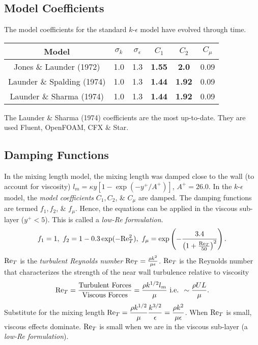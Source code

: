 \documentclass[oneside]{book}
\numberwithin{equation}{section}
\begin{document}
\subsection{Model Coefficients}
The model coefficients for the standard $k$-$\epsilon$ model have evolved through time.
\begin{table}[H]
	\centering
	\begin{tabular}{|c|c|c|c|c|c|}
		\hline
		\textbf{Model} & $\sigma_k$ & $\sigma_\epsilon$ & $C_1$ & $C_2$ & $C_\mu$ \\
		\hline
		Jones \& Launder (1972) & 1.0 & 1.3 & \textbf{1.55} & \textbf{2.0} & 0.09 \\
		\hline
		Launder \& Spalding (1974) & 1.0 & 1.3 & \textbf{1.44} & \textbf{1.92} & 0.09 \\
		\hline
		Launder \& Sharma (1974) & 1.0 & 1.3 & \textbf{1.44} & \textbf{1.92} & 0.09 \\
		\hline
	\end{tabular}
\end{table}
The Launder \& Sharma (1974) coefficients are the most up-to-date. They are used Fluent, OpenFOAM, CFX \& Star.

\subsection{Damping Functions}
In the mixing length model, the mixing length was damped close to the wall (to account for viscosity) $l_m = \kappa y\left[1 - \exp(-y^+/A^+)\right]$, $A^+ = 26.0$. In the $k$-$\epsilon$ model, the \textit{model coefficients} $C_1,C_2$, \& $C_\mu$ are damped. The damping functions are termed $f_1,f_2$, \& $f_\mu$. Hence, the equations can be applied in the viscous sub-layer ($y^+ < 5$). This is called a \textit{low-Re formulation}.
\begin{align*}
	f_1 = 1,\ f_2 = 1 - 0.3\exp(-{\rm Re}_T^2),\ f_\mu = \exp\left(-\frac{3.4}{\left(1 + \frac{{\rm Re}_T}{50}\right)^2}\right).
\end{align*}
${\rm Re}_T$ is the \textit{turbulent Reynolds number} ${\rm Re}_T = \frac{\rho k^2}{\mu\epsilon}$. ${\rm Re}_T$ is the Reynolds number that characterizes the strength of the near wall turbulence relative to viscosity
\begin{align*}
	{\rm Re}_T = \frac{\mbox{Turbulent Forces}}{\mbox{Viscous Forces}} = \frac{\rho k^{1/2}l_m}{\mu}\mbox{ i.e. }\sim\frac{\rho UL}{\mu}.
\end{align*}
Substitute for the mixing length ${\rm Re}_T = \dfrac{\rho k^{1/2}}{\mu}\dfrac{k^{3/2}}{\epsilon} = \dfrac{\rho k^2}{\mu\epsilon}$. When ${\rm Re}_T$ is small, viscous effects dominate. ${\rm Re}_T$ is small when we are in the viscous sub-layer (a \textit{low-Re formulation}).
\end{document}
